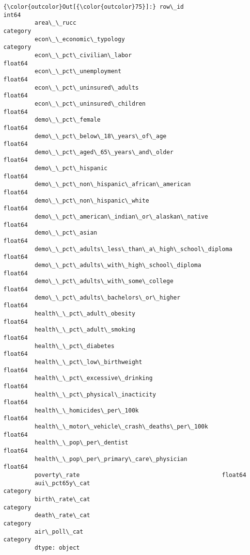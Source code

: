 \documentclass[11pt]{article}
\begin{document}
\begin{Verbatim}[commandchars=\\\{\}]
{\color{outcolor}Out[{\color{outcolor}75}]:} row\_id                                                 int64
         area\_\_rucc                                          category
         econ\_\_economic\_typology                             category
         econ\_\_pct\_civilian\_labor                             float64
         econ\_\_pct\_unemployment                               float64
         econ\_\_pct\_uninsured\_adults                           float64
         econ\_\_pct\_uninsured\_children                         float64
         demo\_\_pct\_female                                     float64
         demo\_\_pct\_below\_18\_years\_of\_age                      float64
         demo\_\_pct\_aged\_65\_years\_and\_older                    float64
         demo\_\_pct\_hispanic                                   float64
         demo\_\_pct\_non\_hispanic\_african\_american              float64
         demo\_\_pct\_non\_hispanic\_white                         float64
         demo\_\_pct\_american\_indian\_or\_alaskan\_native          float64
         demo\_\_pct\_asian                                      float64
         demo\_\_pct\_adults\_less\_than\_a\_high\_school\_diploma     float64
         demo\_\_pct\_adults\_with\_high\_school\_diploma            float64
         demo\_\_pct\_adults\_with\_some\_college                   float64
         demo\_\_pct\_adults\_bachelors\_or\_higher                 float64
         health\_\_pct\_adult\_obesity                            float64
         health\_\_pct\_adult\_smoking                            float64
         health\_\_pct\_diabetes                                 float64
         health\_\_pct\_low\_birthweight                          float64
         health\_\_pct\_excessive\_drinking                       float64
         health\_\_pct\_physical\_inacticity                      float64
         health\_\_homicides\_per\_100k                           float64
         health\_\_motor\_vehicle\_crash\_deaths\_per\_100k          float64
         health\_\_pop\_per\_dentist                              float64
         health\_\_pop\_per\_primary\_care\_physician               float64
         poverty\_rate                                         float64
         aui\_pct65y\_cat                                      category
         birth\_rate\_cat                                      category
         death\_rate\_cat                                      category
         air\_poll\_cat                                        category
         dtype: object
\end{Verbatim}
            
\end{document}
